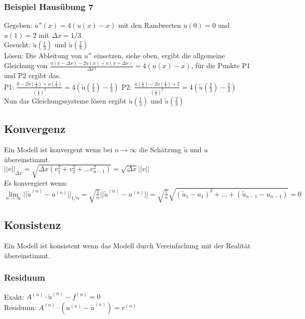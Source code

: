 \subsubsection{Beispiel Hausübung 7}
Gegeben: $ u''(x)=4(u(x)-x) $ mit den Randwerten $ u(0)=0 $  und $ u(1)=2 $ mit $\Delta x=1/3$.
\\
Gesucht: $ \tilde{u}(\frac{1}{3}) $ und $ \tilde{u}(\frac{2}{3}) $
\\
Lösen: Die Ableitung von $ u'' $ einsetzen, siehe oben, ergibt die allgemeine Gleichung von $ \frac{u(x-\Delta x)-2 u(x) + u(x+ \Delta x)}{\Delta x^2} =4 (u(x)-x) $, für die Punkte P1 und P2 ergibt das.
\\
P1: $ \frac{0-2 \tilde{u}(\frac{1}{3}) + \tilde{u}(\frac{2}{3})}{(\frac{1}{3})^2} =4(\tilde{u}(\frac{1}{3})-\frac{1}{3}) $
\qquad \qquad
P2: $ \frac{\tilde{u}(\frac{1}{3})-2 \tilde{u}(\frac{2}{3}) + 2}{(\frac{1}{3})^2} =4(\tilde{u}(\frac{2}{3})-\frac{2}{3}) $
\\
Nun das Gleichungssysteme lösen ergibt $ \tilde{u}(\frac{1}{3}) $ und $ \tilde{u}(\frac{2}{3}) $


\subsection{Konvergenz}
Ein Modell ist konvergent wenn bei $n\rightarrow\infty$ die Schätzung $\tilde{u}$ und $u$ übereinstimmt.\\

$\boxed{||v||_{\Delta x}=\sqrt{\Delta x (v_1^2+v_2^2 + \ldots v_{n-1}^2)}= \sqrt{\Delta
    x}||v||}$\\
Es konvergiert wenn: $\lim\limits_{n\to \infty
  }||\tilde{u}^{(n)}-u^{(n)}||_{1/n}=\sqrt{\frac{1}{n}}||\tilde{u}^{(n)}-u^{(n)}||=\sqrt{\frac{1}{n}}\sqrt{(\tilde{u}_1-u_1)^2
  + \ldots + (\tilde{u}_{n-1}-u_{n-1})}=0$\\

\subsection{Konsistenz}
Ein Modell ist konsistent wenn das Modell durch Vereinfachung mit der Realität übereinstimmt.

\subsubsection{Residuum}
Exakt: $A^{(n)}\cdot \tilde{u}^{(n)}-f^{(n)}=0$\\
Residuum: $A^{(n)}\cdot (u^{(n)}-\tilde{u}^{(n)})=r^{(n)}$

